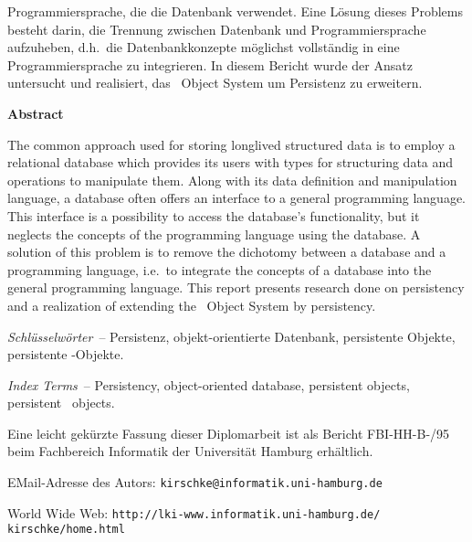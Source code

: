 Programmiersprache, die die Datenbank verwendet.  Eine L\"{o}sung dieses
Problems besteht darin, die Trennung zwischen Datenbank und
Programmiersprache aufzuheben, d.h.\ die Datenbankkonzepte m\"{o}glichst
vollst\"{a}ndig in eine Programmiersprache zu integrieren. In diesem
Bericht wurde der Ansatz untersucht und realisiert, das
\cl\ Object System um Persistenz zu erweitern.
%
\vspace*{2\bigskipamount}%
\par\noindent\centerline{\textbf{\Large Abstract}}
%
\vspace*{\smallskipamount}\par
The common approach used for storing longlived structured data is to
employ a relational database which provides its users with types for
structuring data and operations to manipulate them. Along with its
data definition and manipulation language, a database often offers an
interface to a general programming language. This interface is a
possibility to access the database's functionality, but it neglects
the concepts of the programming language using the database.  A
solution of this problem is to remove the dichotomy between a database
and a programming language, i.e.\ to integrate the concepts of a
database into the general programming language. This report presents
research done on persistency and a realization of extending the
\cl\ Object System by persistency.
%
\vspace*{2cm}%
%
\par\noindent\textit{Schl\"{u}sselw\"{o}rter}\ --
Persistenz, objekt-orientierte Datenbank, persistente Objekte,
persistente \clos-Objekte.
%
\vspace*{\smallskipamount}%
%
\par\noindent\textit{Index Terms}\ --
Persistency,
object-oriented database,
persistent objects,
persistent \clos\ objects.
%
\vspace*{3cm}
%
\begin{small}%
\ifbericht\else
\par\noindent%
Eine leicht gek\"{u}rzte Fassung dieser Diplomarbeit ist als Bericht
FBI-HH-B-\thisreportnumber/95 beim Fachbereich Informatik der
Universit\"{a}t Hamburg erh\"{a}ltlich.\\[\medskipamount]
\fi%
\par\noindent%
EMail-Adresse des Autors:
\texttt{kirschke@informatik.uni-hamburg.de}
\par\noindent%
World Wide Web:
\texttt{http://lki-www.informatik.uni-hamburg.de/%
\td{}kirschke/home.html}
\end{small}
